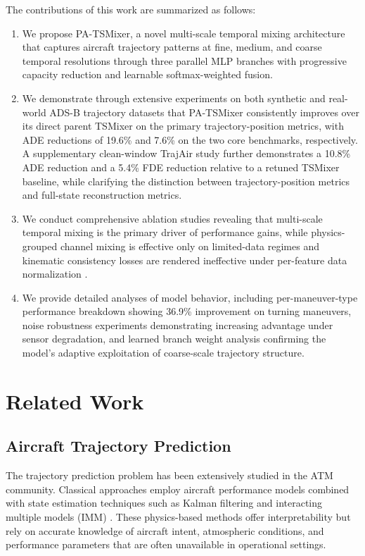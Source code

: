 \documentclass[letterpaper,journal]{IEEEtran}
\begin{document}
The contributions of this work are summarized as follows:
\begin{enumerate}
\item We propose PA-TSMixer, a novel multi-scale temporal mixing architecture that
captures aircraft trajectory patterns at fine, medium, and coarse temporal resolutions
through three parallel MLP branches with progressive capacity reduction and learnable
softmax-weighted fusion.
\item We demonstrate through extensive experiments on both synthetic and real-world
ADS-B trajectory datasets \cite{Arteaga2024} that PA-TSMixer consistently improves
over its direct parent TSMixer on the primary trajectory-position metrics, with ADE
reductions of 19.6\% and 7.6\% on the two core benchmarks, respectively. A
supplementary clean-window TrajAir study further demonstrates a 10.8\% ADE
reduction and a 5.4\% FDE reduction relative to a retuned TSMixer baseline,
while clarifying the distinction between trajectory-position metrics and
full-state reconstruction metrics.
\item We conduct comprehensive ablation studies revealing that multi-scale temporal
mixing is the primary driver of performance gains, while physics-grouped channel mixing
is effective only on limited-data regimes and kinematic consistency losses are rendered
ineffective under per-feature data normalization \cite{Zeng2023DLinear,Chen2023TSMixer}.
\item We provide detailed analyses of model behavior, including per-maneuver-type
performance breakdown showing 36.9\% improvement on turning maneuvers, noise robustness
experiments demonstrating increasing advantage under sensor degradation, and learned
branch weight analysis confirming the model's adaptive exploitation of coarse-scale
trajectory structure.
\end{enumerate}


\section{Related Work}

\subsection{Aircraft Trajectory Prediction}
The trajectory prediction problem has been extensively studied in the ATM community.
Classical approaches employ aircraft performance models combined with state estimation
techniques such as Kalman filtering and interacting multiple models (IMM)
\cite{Lymperopoulos2010,Liu2016,Zhang2021}. These physics-based methods offer
interpretability but rely on accurate knowledge of aircraft intent, atmospheric
conditions, and performance parameters that are often unavailable in operational settings.
\end{document}
